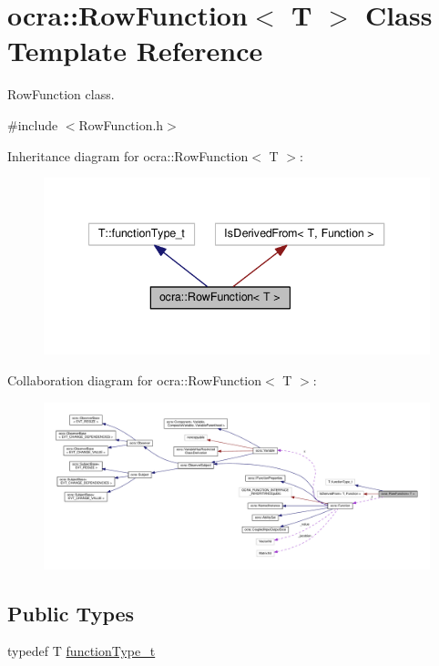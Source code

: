 \hypertarget{classocra_1_1RowFunction}{}\section{ocra\+:\+:Row\+Function$<$ T $>$ Class Template Reference}
\label{classocra_1_1RowFunction}


Row\+Function class.  




{\ttfamily \#include $<$Row\+Function.\+h$>$}



Inheritance diagram for ocra\+:\+:Row\+Function$<$ T $>$\+:
\nopagebreak
\begin{figure}[H]
\begin{center}
\leavevmode
\includegraphics[width=340pt]{db/da9/classocra_1_1RowFunction__inherit__graph}
\end{center}
\end{figure}


Collaboration diagram for ocra\+:\+:Row\+Function$<$ T $>$\+:
\nopagebreak
\begin{figure}[H]
\begin{center}
\leavevmode
\includegraphics[width=350pt]{d6/d3b/classocra_1_1RowFunction__coll__graph}
\end{center}
\end{figure}
\subsection*{Public Types}
\begin{DoxyCompactItemize}
\item 
typedef T \hyperlink{classocra_1_1RowFunction_a4b6faf57022f367fdcff681c2dc98306}{function\+Type\+\_\+t}
\end{DoxyCompactItemize}
